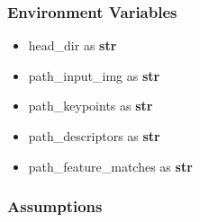 \documentclass[12pt, titlepage]{article}
\begin{document}


\subsubsection{Environment Variables}
\begin{itemize}
  \item head\_dir as \textbf{str}
  \item path\_input\_img as \textbf{str} 
  \item path\_keypoints as \textbf{str}
  \item path\_descriptors as \textbf{str}
  \item path\_feature\_matches as \textbf{str}
\end{itemize}


\subsubsection{Assumptions}

\end{document}
